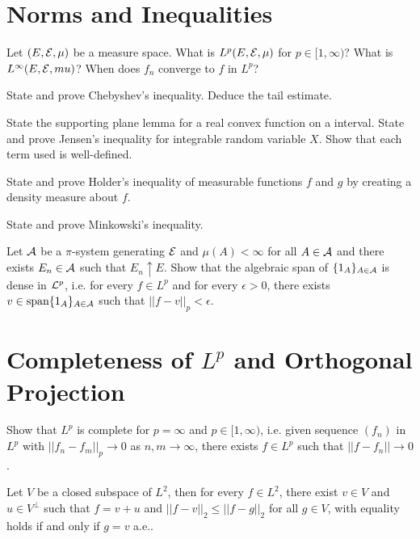 \section{Norms and Inequalities}

\begin{question}{22}
	Let $(E,\mathcal{E},\mu)$ be a measure space. What is $L^p(E,\mathcal{E},\mu)$ for $p \in [1,\infty)$? What is $L^\infty(E,\mathcal{E},mu)$? When does $f_n$ converge to $f$ in $L^p$?
	
	State and prove Chebyshev's inequality. Deduce the tail estimate.
	
	State the supporting plane lemma for a real convex function on a interval. State and prove Jensen's inequality for integrable random variable $X$. Show that each term used is well-defined.
\end{question}

\begin{question}{23}
	State and prove Holder's inequality of measurable functions $f$ and $g$ by creating a density measure about $f$.
	
	State and prove Minkowski's inequality.
	
	Let $\mathcal{A}$ be a $\pi$-system generating $\mathcal{E}$ and $\mu(A) < \infty$ for all $A \in \mathcal{A}$ and there exists $E_n \in \mathcal{A}$ such that $E_n \uparrow E$.  Show that the algebraic span of $\{1_A\}_{A\in \mathcal{A}}$ is dense in $\mathcal{L}^p$, i.e. for every $f \in L^p$ and for every $\epsilon > 0$, there exists $v \in \text{span}\{1_A\}_{A\in \mathcal{A}}$ such that $||f - v||_p < \epsilon$.
\end{question}

\section{Completeness of $L^p$ and Orthogonal Projection}
\begin{question}{24}
	Show that $L^p$ is complete for $p = \infty$ and $p \in [1,\infty)$, i.e. given sequence $(f_n)$ in $L^p$ with $||f_n - f_m||_p \rightarrow 0$ as $n,m \rightarrow \infty$, there exists $f \in L^p$ such that $||f - f_n|| \rightarrow 0$.
\end{question}

\begin{question}{25}
	Let $V$ be a closed subspace of $L^2$, then for every $f \in L^2$, there exist $v \in V$ and $u \in V^\perp$ such that $f = v + u$ and $||f-v||_2 \leq ||f-g||_2$ for all $g \in V$, with equality holds if and only if $g = v$ a.e..
\end{question}
 